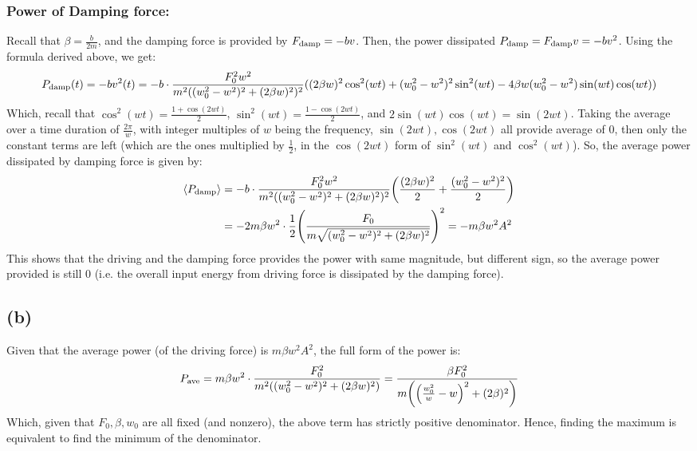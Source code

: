 \documentclass{article}
\DeclarePairedDelimiter{\paran}{(}{)}%
\DeclarePairedDelimiter{\bracket}{\langle}{\rangle}
\begin{document}
\subsubsection*{Power of Damping force:}
Recall that $\beta=\frac{b}{2m}$, and the damping force is provided by $F_{\textmd{damp}} = -bv$. Then, the power dissipated $P_{\textmd{damp}}=F_{\textmd{damp}}v = -bv^2$. Using the formula derived above, we get:
\begin{equation}
    P_{\textmd{damp}}(t)=-bv^2(t) = -b\cdot \frac{F_0^2w^2}{m^2((w_0^2-w^2)^2+(2\beta w)^2)^2}((2\beta w)^2\cos^2(wt)+(w_0^2-w^2)^2\sin^2(wt)-4\beta w(w_0^2-w^2)\sin(wt)\cos(wt))
\end{equation}
Which, recall that $\cos^2(wt)=\frac{1+\cos(2wt)}{2}$, $\sin^2(wt)=\frac{1-\cos(2wt)}{2}$, and $2\sin(wt)\cos(wt)=\sin(2wt)$. Taking the average over a time duration of $\frac{2\pi}{w}$, with integer multiples of $w$ being the frequency, $\sin(2wt),\cos(2wt)$ all provide average of $0$, then only the constant terms are left (which are the ones multiplied by $\frac{1}{2}$, in the $\cos(2wt)$ form of $\sin^2(wt)$ and $\cos^2(wt)$). So, the average power dissipated by damping force is given by:
\begin{align}
    \bracket*{P_\textmd{damp}} &= -b\cdot\frac{F_0^2w^2}{m^2((w_0^2-w^2)^2+(2\beta w)^2)^2}\paran*{\frac{(2\beta w)^2}{2}+\frac{(w_0^2-w^2)^2}{2}}\\
    &= -2m\beta w^2\cdot\frac{1}{2}\paran*{\frac{F_0}{m\sqrt{(w_0^2-w^2)^2+(2\beta w)^2}}}^2 = -m\beta w^2A^2
\end{align}
This shows that the driving and the damping force provides the power with same magnitude, but different sign, so the average power provided is still $0$ (i.e. the overall input energy from driving force is dissipated by the damping force).

\subsection*{(b)}
Given that the average power (of the driving force) is $m\beta w^2A^2$, the full form of the power is:
\begin{eqnarray}
    P_\textmd{ave} = m\beta w^2\cdot\frac{F_0^2}{m^2((w_0^2-w^2)^2+(2\beta w)^2)} = \frac{\beta F_0^2}{m\paran*{\paran*{\frac{w_0^2}{w}-w}^2+(2\beta)^2}}
\end{eqnarray}
Which, given that $F_0,\beta,w_0$ are all fixed (and nonzero), the above term has strictly positive denominator. Hence, finding the maximum is equivalent to find the minimum of the denominator.
\end{document}
